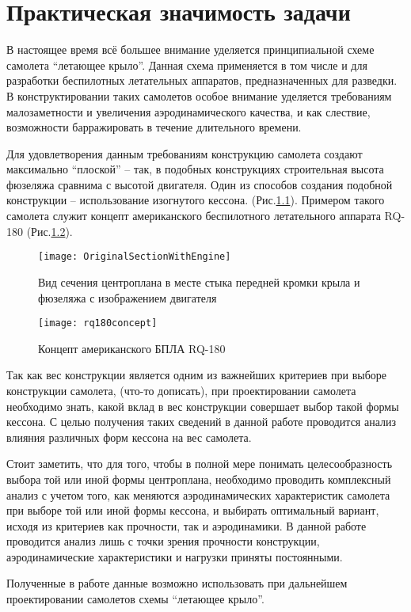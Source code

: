 \chapter{Практическая значимость задачи}

В настоящее время всё большее внимание уделяется принципиальной схеме самолета ``летающее крыло''. Данная схема применяется в том числе и для разработки беспилотных летательных аппаратов, предназначенных для разведки. В конструктировании таких самолетов особое внимание уделяется требованиям малозаметности и увеличения аэродинамического качества, и как слествие, возможности барражировать в течение длительного времени. 

Для удовлетворения данным требованиям конструкцию самолета создают максимально ``плоской'' -- так, в подобных конструкциях строительная высота фюзеляжа сравнима с высотой двигателя. Один из способов создания подобной конструкции -- использование изогнутого кессона. (Рис.\ref{fig:OriginalSectionWithEngine}). Примером такого самолета служит концепт американского беспилотного летательного аппарата RQ-180 (Рис.\ref{fig:rq180}). 

\begin{figure}[ht]
\centering
\texttt{[image: OriginalSectionWithEngine]}
\caption{Вид сечения центроплана в месте стыка передней кромки крыла и фюзеляжа с изображением двигателя}
\label{fig:OriginalSectionWithEngine}
\end{figure}

\begin{figure}[ht]
\centering
\texttt{[image: rq180concept]}
\caption{Концепт американского БПЛА RQ-180}
\label{fig:rq180}
\end{figure}

Так как вес конструкции является одним из важнейших критериев при выборе конструкции самолета, (что-то дописать), при проектировании самолета необходимо знать, какой вклад в вес конструкции совершает выбор такой формы кессона. С целью получения таких сведений в данной работе проводится анализ влияния различных форм кессона на вес самолета. 

Стоит заметить, что для того, чтобы в полной мере понимать целесообразность выбора той или иной формы центроплана, необходимо проводить комплексный анализ с учетом того, как меняются аэродинамических характеристик самолета при выборе той или иной формы кессона, и выбирать оптимальный вариант, исходя из критериев как прочности, так и аэродинамики. В данной работе проводится анализ лишь с точки зрения прочности конструкции, аэродинамические характеристики и нагрузки приняты постоянными. 

Полученные в работе данные возможно использовать при дальнейшем проектировании самолетов схемы ``летающее крыло''. 
